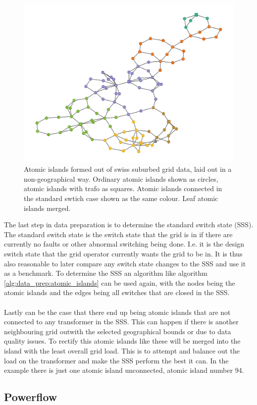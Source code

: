 \begin{figure}[H]
    \begin{center}
        \includegraphics[width=.9\linewidth]{img/switchstate_exploring/swiss_suburb/topology_sss.png}
    \end{center}
    \caption{
        Atomic islands formed out of swiss suburbed grid data, laid out in a non-geographical way.
        Ordinary atomic islands shown as circles, atomic islands with trafo as squares. Atomic islands connected in the
        standard swtich case shown as the same colour. Leaf atomic islands merged.
    }
    \label{fig:data_prep:swiss_suburb_topology}
\end{figure}

The last step in data preparation is to determine the standard switch state (SSS). The standard switch
state is the switch state that the grid is in if there are currently no faults or other abnormal
switching being done. I.e. it is the design switch state that the grid operator currently wants the
grid to be in. It is thus also reasonable to later compare any switch state changes to
the SSS and use it as a benchmark. To determine the SSS
an algorithm like algorithm \ref{alg:data_prep:atomic_islands} can be used again, with the nodes being
the atomic islands and the edges being all switches that are closed in the SSS.\\
\\
Lastly can be the case that there end up being atomic islands that are not connected to any
transformer in the SSS. This can happen if there is another neighbouring grid outwith the selected
geographical bounds or due to data quality issues. To rectify this atomic islands like these will
be merged into the island with the least overall grid load. This is to attempt and balance out
the load on the transformer and make the SSS perform the best it can. In the example
there is just one atomic island unconnected, atomic island number 94. 

\subsection{Powerflow}


